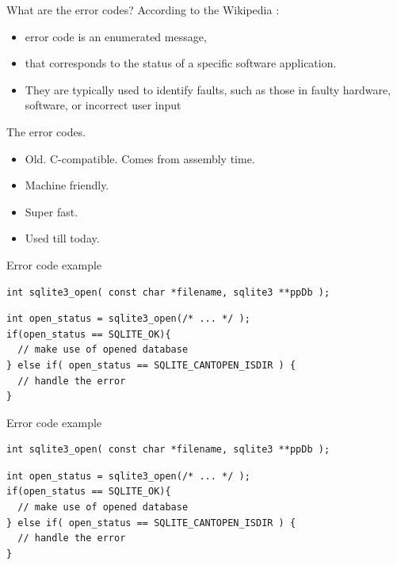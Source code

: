 \documentclass[10pt]{beamer}
\begin{document}
\begin{frame}{What are the error codes?}
	According to the \alert{Wikipedia} :
	\begin{itemize}[<+- | alert@+>]
		\item error code is an enumerated message,
		\item that corresponds to the status of a specific software application.
		\item They are typically used to identify faults, such as those in faulty hardware, software, or incorrect user input
	\end{itemize}
\end{frame}

\begin{frame}{The error codes.}
	\begin{itemize}[<+- | alert@+>]
		\item Old. C-compatible. Comes from assembly time.
		\item Machine friendly.
		\item Super fast.
		\item Used till today.
	\end{itemize}
\end{frame}

\begin{frame}[fragile]{Error code example}
	\begin{verbatim}
int sqlite3_open( const char *filename, sqlite3 **ppDb );
	\end{verbatim}
	
	\pause
	
	\hrulefill
	
	\begin{verbatim}
int open_status = sqlite3_open(/* ... */ );
if(open_status == SQLITE_OK){
  // make use of opened database
} else if( open_status == SQLITE_CANTOPEN_ISDIR ) {
  // handle the error
}
	\end{verbatim}
	
\end{frame}

\begin{frame}[fragile]{Error code example}
\begin{verbatim}
int sqlite3_open( const char *filename, sqlite3 **ppDb );
\end{verbatim}

\hrulefill

\begin{verbatim}
int open_status = sqlite3_open(/* ... */ );
if(open_status == SQLITE_OK){
  // make use of opened database
} else if( open_status == SQLITE_CANTOPEN_ISDIR ) {
  // handle the error
}
\end{verbatim}

\end{frame}
\end{document}

